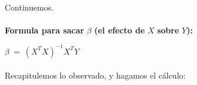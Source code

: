 \documentclass[10pt]{article}
\begin{document}
\paragraph{}Continuemos.





\paragraph{}{\Large \textbf{Formula para sacar }$\displaystyle \beta $\textbf{ (el efecto de }$\displaystyle X$\textbf{ sobre }$\displaystyle Y$\textbf{):}}



$\displaystyle \beta \ =\ \left( X^{T} X\right)^{-1} X^{T} Y$



\paragraph{}Recapitulemos lo observado, y hagamos el c\'alculo:
\end{document}
